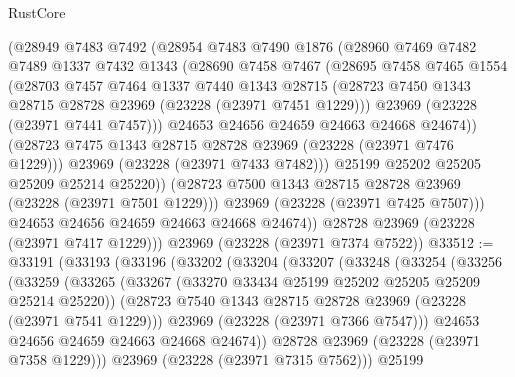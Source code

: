 \begin{lexlean}{RustCore}
\begin{coremodule}
            (@28949
              @7483
              @7492
              (@28954
                @7483
                @7490
                @1876
                (@28960
                  @7469
                  @7482
                  @7489
                  @1337
                  @7432
                  @1343
                  (@28690
                    @7458
                    @7467
                    (@28695
                      @7458
                      @7465
                      @1554
                      (@28703
                        @7457
                        @7464
                        @1337
                        @7440
                        @1343
                        @28715
                        (@28723 @7450 @1343 @28715 @28728 @23969 (@23228 (@23971 @7451 @1229)))
                        @23969
                        (@23228 (@23971 @7441 @7457)))
                      @24653
                      @24656
                      @24659
                      @24663
                      @24668
                      @24674))
                  (@28723 @7475 @1343 @28715 @28728 @23969 (@23228 (@23971 @7476 @1229)))
                  @23969
                  (@23228 (@23971 @7433 @7482)))
                @25199
                @25202
                @25205
                @25209
                @25214
                @25220))
            (@28723 @7500 @1343 @28715 @28728 @23969 (@23228 (@23971 @7501 @1229)))
            @23969
            (@23228 (@23971 @7425 @7507)))
          @24653
          @24656
          @24659
          @24663
          @24668
          @24674))
      @28728
      @23969
      (@23228 (@23971 @7417 @1229)))
    @23969
    (@23228 (@23971 @7374 @7522))
@33512 := @33191
    (@33193
      (@33196
        (@33202
          (@33204
            (@33207
              (@33248
                (@33254
                  (@33256
                    (@33259
                      (@33265
                        (@33267 (@33270 @33434 @25199 @25202 @25205 @25209 @25214 @25220))
                        (@28723 @7540 @1343 @28715 @28728 @23969 (@23228 (@23971 @7541 @1229)))
                        @23969
                        (@23228 (@23971 @7366 @7547)))
                      @24653
                      @24656
                      @24659
                      @24663
                      @24668
                      @24674))
                  @28728
                  @23969
                  (@23228 (@23971 @7358 @1229)))
                @23969
                (@23228 (@23971 @7315 @7562)))
              @25199

\end{coremodule}
\end{lexlean}
